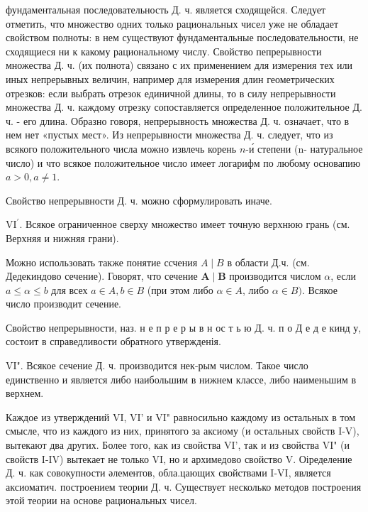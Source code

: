 \documentclass[10pt]{article}
\begin{document}
фундаментальная последовательность Д. ч. является сходящейся. Следует отметить, что множество одних только рациональных чисел уже не обладает свойством полноты: в нем существуют фундаментальные последовательности, не сходящиеся ни к какому рациональному числу. Свойство пепрерывности множества Д. ч. (их полнота) связано с их применением для измерения тех или иных непрерывных величин, например для измерения длин геометрических отрезков: если выбрать отрезок единичной длины, то в силу непрерывности множества Д. ч. каждому отрезку сопоставляется определенное положительное Д. ч. - его длина. Образно говоря, непрерывность множества Д. ч. означает, что в нем нет «пустых мест». Из непрерывности множества Д. ч. следует, что из всякого положительного числа можно извлечь корень $n$-и́ степени (n- натуральное число) и что всякое положительное число имеет логарифм по любому основапию $a>0, a \neq 1$.



Свойство непрерывности Д. ч. можно сформулировать иначе.



$\mathrm{VI}^{\prime}$. Всякое ограниченное сверху множество имеет точную верхнюю грань (см. Верхняя и нижняя грани).



Можно использовать также понятие ссчения $A \mid B$ в области Д.ч. (см. Дедекиндово сечение). Говорят, что сечение $\boldsymbol{A} \mid \boldsymbol{B}$ производится числом $\alpha$, если $a \leqslant \alpha \leqslant b$ для всех $a \in A, b \in B$ (при этом либо $\alpha \in A$, либо $\alpha \in B)$. Всякое число производит сечение.



Свойство непрерывности, наз. н е п р е р ы в н ос т ь ю Д. ч. п о Д е д е кинд у, состоит в справедливости обратного утвержденія.



VI". Всякое сечение Д. ч. производится нек-рым числом. Такое число единственно и является либо наибольшим в нижнем классе, либо наименьшим в верхнем.



Каждое из утверждений VI, VI' и VI" равносильно каждому из остальных в том смысле, что из каждого из них, принятого за аксиому (и остальных свойств I-V), вытекают два других. Более того, как из свойства VI', так и из свойства VI" (и свойств I-IV) вытекает не только VI, но и архимедово свойство V. Оіределение Д. ч. как совокупности әлементов, обла.цающих свойствами I-VI, является аксиоматич. построением теории Д. ч. Существует несколько методов построения этой теории на основе рациональных чисел.
\end{document}
